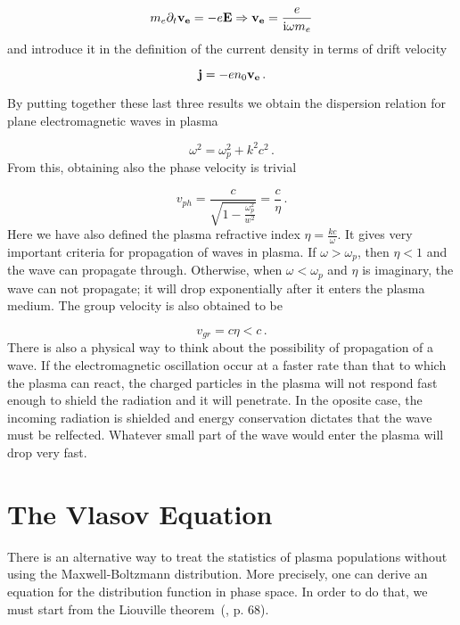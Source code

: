 \documentclass[12pt, class=report, crop=false]{standalone}
\begin{document}
\begin{equation}
  m_e \partial_t \vb{v_e} = - e \vb{E} \Rightarrow \vb{v_e} = \frac{e}{\mathrm{i} \omega m_e}
\end{equation}
and introduce it in the definition of the current density in terms of drift velocity

\begin{equation}
  \vb{j} = -e n_0 \vb{v_e}\,.
\end{equation}

By putting together these last three results we obtain the dispersion relation for plane electromagnetic waves in plasma

\begin{equation}
  \omega^2= \omega_p^2 +k^2c^2\,.
\end{equation}
From this, obtaining also the phase velocity is trivial

\begin{equation}
  v_{ph} = \frac{c}{\sqrt{1-\frac{\omega_p^2}{w^2}}} = \frac{c}{\eta}\,.
\end{equation}
Here we have also defined the plasma refractive index \(\eta = \frac{kc}{\omega}\). It gives very important criteria for propagation of waves in plasma. If \(\omega >\omega_p\), then \(\eta<1\) and the wave can propagate through. Otherwise, when \(\omega<\omega_p\) and \(\eta\) is imaginary, the wave can not propagate; it will drop exponentially after it enters the plasma medium. The group velocity is also obtained to be

\begin{equation}
  v_{gr} = c\eta < c\,.
\end{equation}
There is also a physical way to think about the possibility of propagation of a wave. If the electromagnetic oscillation occur at a faster rate than that to which the plasma can react, the charged particles in the plasma will not respond fast enough to shield the radiation and it will penetrate. In the oposite case, the incoming radiation is shielded and energy conservation dictates that the wave must be relfected. Whatever small part of the wave would enter the plasma will drop very fast.

\section{The Vlasov Equation}

There is an alternative way to treat the statistics of plasma populations without using the Maxwell-Boltzmann distribution. More precisely, one can derive an equation for the distribution function in phase space. In order to do that, we must start from the Liouville theorem~(\cite{arnoldMathematicalMethodsClassical1997}, p. 68).
\end{document}
